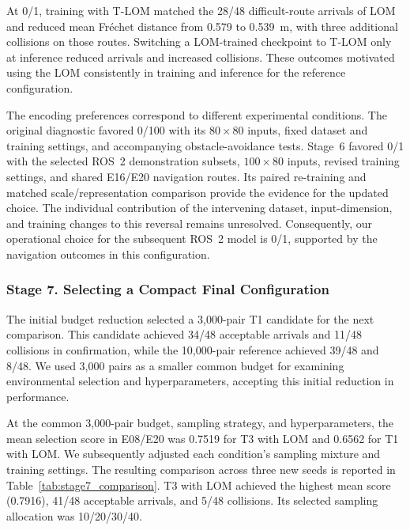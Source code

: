 \documentclass[robotics,article,submit,pdftex,moreauthors]{Definitions/mdpi}
\begin{document}
At 0/1, training with T-LOM matched the 28/48 difficult-route arrivals of LOM and reduced mean Fr\'echet distance from 0.579 to 0.539~m, with three additional collisions on those routes. Switching a LOM-trained checkpoint to T-LOM only at inference reduced arrivals and increased collisions. These outcomes motivated using the LOM consistently in training and inference for the reference configuration.

The encoding preferences correspond to different experimental conditions. The original diagnostic favored 0/100 with its $80\times80$ inputs, fixed dataset and training settings, and accompanying obstacle-avoidance tests. Stage~6 favored 0/1 with the selected ROS~2 demonstration subsets, $100\times80$ inputs, revised training settings, and shared E16/E20 navigation routes. Its paired re-training and matched scale/representation comparison provide the evidence for the updated choice. The individual contribution of the intervening dataset, input-dimension, and training changes to this reversal remains unresolved. Consequently, our operational choice for the subsequent ROS~2 model is 0/1, supported by the navigation outcomes in this configuration.

\subsubsection{Stage 7. Selecting a Compact Final Configuration}\label{subsec:stage7_results}

The initial budget reduction selected a 3,000-pair T1 candidate for the next comparison. This candidate achieved 34/48 acceptable arrivals and 11/48 collisions in confirmation, while the 10,000-pair reference achieved 39/48 and 8/48. We used 3,000 pairs as a smaller common budget for examining environmental selection and hyperparameters, accepting this initial reduction in performance.

At the common 3,000-pair budget, sampling strategy, and hyperparameters, the mean selection score in E08/E20 was 0.7519 for T3 with LOM and 0.6562 for T1 with LOM. We subsequently adjusted each condition's sampling mixture and training settings. The resulting comparison across three new seeds is reported in Table~\ref{tab:stage7_comparison}. T3 with LOM achieved the highest mean score (0.7916), 41/48 acceptable arrivals, and 5/48 collisions. Its selected sampling allocation was 10/20/30/40.
\end{document}
